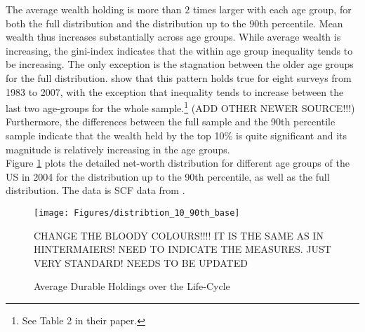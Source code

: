 \documentclass[a4paper,12pt]{article}
\begin{document}
The average wealth holding is more than $2$ times larger with each age group, for both the full distribution and the distribution up to the 90th percentile. Mean wealth thus increases substantially across age groups. While average wealth is increasing, the gini-index indicates that the within age group inequality tends to be increasing. The only exception is the stagnation between the older age groups for the full distribution. \cite{hintermaier2011} show that this pattern holds true for eight surveys from 1983 to 2007, with the exception that inequality tends to  increase between the last two age-groups for the whole sample.\footnote{See Table 2 in their paper.} (ADD OTHER NEWER SOURCE!!!) \\

Furthermore, the differences between the full sample and the 90th percentile sample indicate that the wealth held by the top 10\% is quite significant and its magnitude is relatively increasing in the age groups. \\
Figure \ref{wealth_data_90} plots the detailed net-worth distribution for different age groups of the US in 2004 for the distribution up to the 90th percentile, as well as the full distribution. The data is SCF data from \cite{hintermaier2011}.

\begin{figure}[!htbp]
\caption{Average Durable Holdings over the Life-Cycle} 
\label{wealth_data_90}	%
\centering
\texttt{[image: Figures/distribtion\_10\_90th\_base]}  %

\begin{minipage}{0.8\linewidth}
\footnotesize{CHANGE THE BLOODY COLOURS!!!! IT IS THE SAME AS IN HINTERMAIERS! NEED TO INDICATE THE MEASURES. JUST VERY STANDARD! NEEDS TO BE UPDATED}
\end{minipage}

\end{figure}
\end{document}
